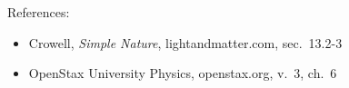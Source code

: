 References:
\begin{itemize}
\item Crowell, \emph{Simple Nature}, lightandmatter.com, sec.~13.2-3
\item OpenStax University Physics, openstax.org, v.~3, ch.~6
\end{itemize}
